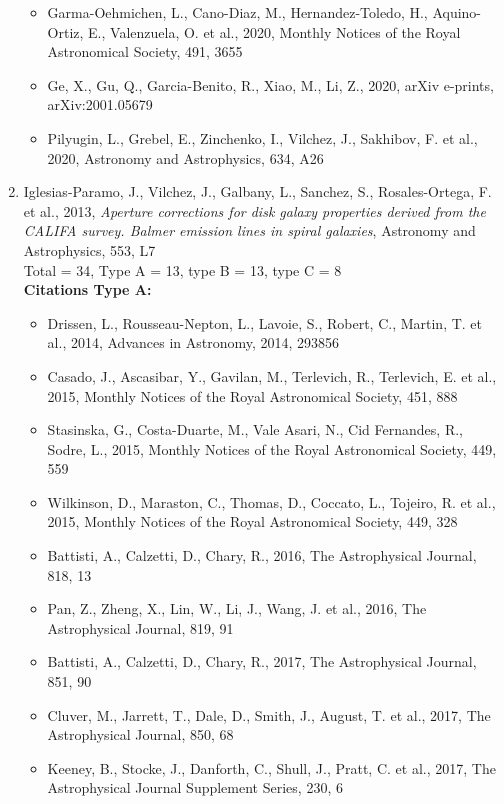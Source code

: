 \documentclass{letter}
\begin{document}
\begin{enumerate}
\begin{itemize}
\item Garma-Oehmichen, L., Cano-Diaz, M., Hernandez-Toledo, H., Aquino-Ortiz, E., Valenzuela, O. et al., 2020, Monthly Notices of the Royal Astronomical Society, 491, 3655
\item Ge, X., Gu, Q., Garcia-Benito, R., Xiao, M., Li, Z., 2020, arXiv e-prints, arXiv:2001.05679
\item Pilyugin, L., Grebel, E., Zinchenko, I., Vilchez, J., Sakhibov, F. et al., 2020, Astronomy and Astrophysics, 634, A26
\end{itemize}
\item Iglesias-Paramo, J., Vilchez, J., Galbany, L., Sanchez, S., Rosales-Ortega, F. et al., 2013, {\it Aperture corrections for disk galaxy properties derived from the CALIFA survey. Balmer emission lines in spiral galaxies}, Astronomy and Astrophysics, 553, L7 \\ 
Total = 34, Type A = 13, type B = 13, type C = 8 \\ 
{\bf Citations Type A:}
\begin{itemize}
\item Drissen, L., Rousseau-Nepton, L., Lavoie, S., Robert, C., Martin, T. et al., 2014, Advances in Astronomy, 2014, 293856
\item Casado, J., Ascasibar, Y., Gavilan, M., Terlevich, R., Terlevich, E. et al., 2015, Monthly Notices of the Royal Astronomical Society, 451, 888
\item Stasinska, G., Costa-Duarte, M., Vale Asari, N., Cid Fernandes, R., Sodre, L., 2015, Monthly Notices of the Royal Astronomical Society, 449, 559
\item Wilkinson, D., Maraston, C., Thomas, D., Coccato, L., Tojeiro, R. et al., 2015, Monthly Notices of the Royal Astronomical Society, 449, 328
\item Battisti, A., Calzetti, D., Chary, R., 2016, The Astrophysical Journal, 818, 13
\item Pan, Z., Zheng, X., Lin, W., Li, J., Wang, J. et al., 2016, The Astrophysical Journal, 819, 91
\item Battisti, A., Calzetti, D., Chary, R., 2017, The Astrophysical Journal, 851, 90
\item Cluver, M., Jarrett, T., Dale, D., Smith, J., August, T. et al., 2017, The Astrophysical Journal, 850, 68
\item Keeney, B., Stocke, J., Danforth, C., Shull, J., Pratt, C. et al., 2017, The Astrophysical Journal Supplement Series, 230, 6

\end{itemize}
\end{enumerate}
\end{document}
